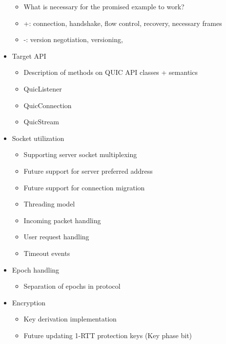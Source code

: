 \begin{itemize}
\begin{itemize}
        \item What is necessary for the promised example to work?
        \item +: connection, handshake, flow control, recovery, necessary frames
        \item -: version negotiation, versioning,

    \end{itemize}

    \item Target API
    \begin{itemize}

        \item Description of methods on QUIC API classes + semantics
        \item QuicListener
        \item QuicConnection
        \item QuicStream

    \end{itemize}

    \item Socket utilization
    \begin{itemize}

        \item Supporting server socket multiplexing
        \item Future support for server preferred address
        \item Future support for connection migration
        \item Threading model
        \item Incoming packet handling
        \item User request handling
        \item Timeout events

    \end{itemize}

    \item Epoch handling
    \begin{itemize}
        \item Separation of epochs in protocol
    \end{itemize}

    \item Encryption
    \begin{itemize}

        \item Key derivation implementation
        \item Future updating 1-RTT protection keys (Key phase bit)


\end{itemize}
\end{itemize}
